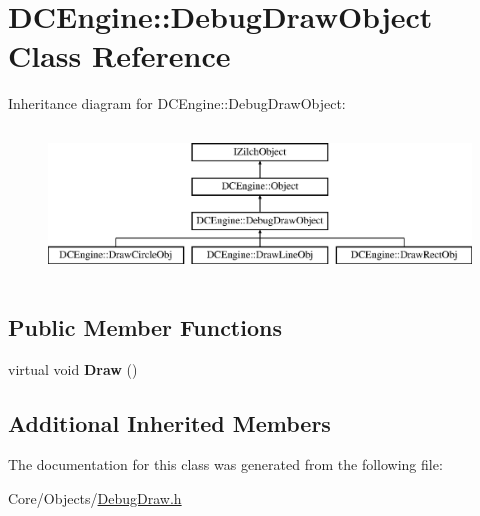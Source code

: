 \hypertarget{classDCEngine_1_1DebugDrawObject}{\section{D\-C\-Engine\-:\-:Debug\-Draw\-Object Class Reference}
\label{classDCEngine_1_1DebugDrawObject}
}
Inheritance diagram for D\-C\-Engine\-:\-:Debug\-Draw\-Object\-:\begin{figure}[H]
\begin{center}
\leavevmode
\includegraphics[height=3.992870cm]{classDCEngine_1_1DebugDrawObject}
\end{center}
\end{figure}
\subsection*{Public Member Functions}
\begin{DoxyCompactItemize}
\item 
\hypertarget{classDCEngine_1_1DebugDrawObject_a7d80a0a2d5ea0e723f7a5df0cf4c7f04}{virtual void {\bfseries Draw} ()}\label{classDCEngine_1_1DebugDrawObject_a7d80a0a2d5ea0e723f7a5df0cf4c7f04}

\end{DoxyCompactItemize}
\subsection*{Additional Inherited Members}


The documentation for this class was generated from the following file\-:\begin{DoxyCompactItemize}
\item 
Core/\-Objects/\hyperlink{DebugDraw_8h}{Debug\-Draw.\-h}\end{DoxyCompactItemize}
